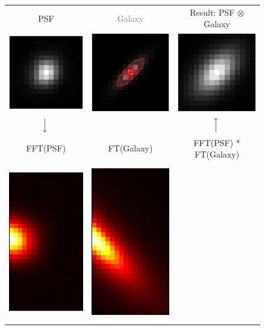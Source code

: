 \documentclass[11pt,preprint]{aastex}
\newcommand{\conv}{\otimes}
\newcommand{\gray}[1]{\textcolor{gray}{#1}}
\begin{document}
\begin{figure}
  \newcommand{\arrowspacer}[1]{\left#1 \textrm{\rule[-0.5em]{0pt}{1em}} \right.}
  \begin{center}
    \begin{tabular}{@{}ccc@{}}
      PSF & \gray{Galaxy} & Result: PSF $\conv$ Galaxy \\
      \includegraphics[height=0.22\textwidth]{psf-00} &
      \includegraphics[height=0.22\textwidth]{psf-04} &
      \includegraphics[height=0.22\textwidth]{psf-05} \\
      \rule[-1em]{0pt}{1.5em}
      $\arrowspacer{\downarrow}$ & & $\arrowspacer{\uparrow}$ \\
      FFT(PSF) & FT(Galaxy) & FFT(PSF) * FT(Galaxy) \\
      \multicolumn{1}{r}{%
        \includegraphics[height=0.22\textwidth]{psf-01}} &
      \multicolumn{1}{r}{%
        \includegraphics[height=0.22\textwidth]{psf-02}} &

\end{tabular}
\end{center}
\end{figure}
\end{document}

